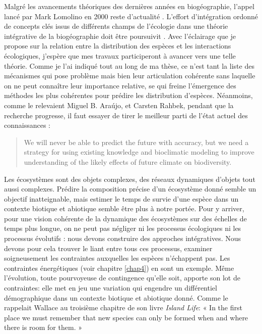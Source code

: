Malgré les avancements théoriques des dernières années en biogéographie,
l'appel lancé par Mark Lomolino en 2000 reste d'actualité
\citep{Lomolino2000}. L'effort d'intégration ordonné de concepts clés
issus de différents champs de l'écologie dans une théorie intégrative de
la biogéographie doit être poursuivit \citep{Thuiller2013}. Avec
l'éclairage que je propose sur la relation entre la distribution des
espèces et les interactions écologiques, j'espère que mes travaux
participeront à avancer vers une telle théorie. Comme je l'ai indiqué
tout au long de ma thèse, ce n'est tant la liste des mécanismes qui pose
problème mais bien leur articulation cohérente sans laquelle on ne peut
connaître leur importance relative, se qui freine l'émergence des
méthodes les plus cohérentes pour prédire les distribution d'espèces.
Néanmoins, comme le relevaient Miguel B. Araújo, et Carsten Rahbek,
pendant que la recherche progresse, il faut essayer de tirer le meilleur
parti de l'état actuel des connaissances \citep{Araujo2006} :

\begin{quote}
We will never be able to predict the future with accuracy, but we need a
strategy for using existing knowledge and bioclimatic modeling to
improve understanding of the likely effects of future climate on
biodiversity.
\end{quote}

Les écosystèmes sont des objets complexes, des réseaux dynamiques
d'objets tout aussi complexes. Prédire la composition précise d'un
écosystème donné semble un objectif inatteignable, mais estimer le temps
de survie d'une espèce dans un contexte biotique et abiotique semble
être plus à notre portée. Pour y arriver, pour une vision cohérente de
la dynamique des écosystèmes sur des échelles de temps plus longue, on
ne peut pas négliger ni les processus écologiques ni les processus
évolutifs : nous devons construire des approches intégratives. Nous
devons pour cela trouver le liant entre tous ces processus, examiner
soigneusement les contraintes auxquelles les espèces n'échappent pas.
Les contraintes énergétiques (voir chapitre \ref{chap4}) en sont un
exemple. Même l'évolution, toute pourvoyeuse de contingence qu'elle
soit, apporte son lot de contraintes: elle met en jeu une variation qui
engendre un différentiel démographique dans un contexte biotique et
abiotique donné. Comme le rappelait Wallace au troisième chapitre de son
livre \emph{Island Life}: « In the first place we must remember that new
species can only be formed when and where there is room for them. »
